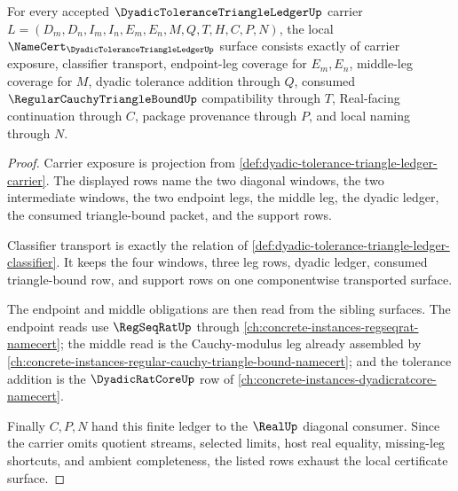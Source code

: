\begin{theorem}
\label{thm:dyadic-tolerance-triangle-ledger-obligations}
For every accepted $\DyadicToleranceTriangleLedgerUp$ carrier $L=(D_m,D_n,I_m,I_n,E_m,E_n,M,Q,T,H,C,P,N)$, the local $\NameCert_{\DyadicToleranceTriangleLedgerUp}$ surface consists exactly of carrier exposure, classifier transport, endpoint-leg coverage for $E_m,E_n$, middle-leg coverage for $M$, dyadic tolerance addition through $Q$, consumed $\RegularCauchyTriangleBoundUp$ compatibility through $T$, Real-facing continuation through $C$, package provenance through $P$, and local naming through $N$.
\end{theorem}
\begin{proof}
Carrier exposure is projection from \autoref{def:dyadic-tolerance-triangle-ledger-carrier}. The displayed rows name the two diagonal windows, the two intermediate windows, the two endpoint legs, the middle leg, the dyadic ledger, the consumed triangle-bound packet, and the support rows.

Classifier transport is exactly the relation of \autoref{def:dyadic-tolerance-triangle-ledger-classifier}. It keeps the four windows, three leg rows, dyadic ledger, consumed triangle-bound row, and support rows on one componentwise transported surface.

The endpoint and middle obligations are then read from the sibling surfaces. The endpoint reads use $\RegSeqRatUp$ through \autoref{ch:concrete-instances-regseqrat-namecert}; the middle read is the Cauchy-modulus leg already assembled by \autoref{ch:concrete-instances-regular-cauchy-triangle-bound-namecert}; and the tolerance addition is the $\DyadicRatCoreUp$ row of \autoref{ch:concrete-instances-dyadicratcore-namecert}.

Finally $C,P,N$ hand this finite ledger to the $\RealUp$ diagonal consumer. Since the carrier omits quotient streams, selected limits, host real equality, missing-leg shortcuts, and ambient completeness, the listed rows exhaust the local certificate surface.
\end{proof}

